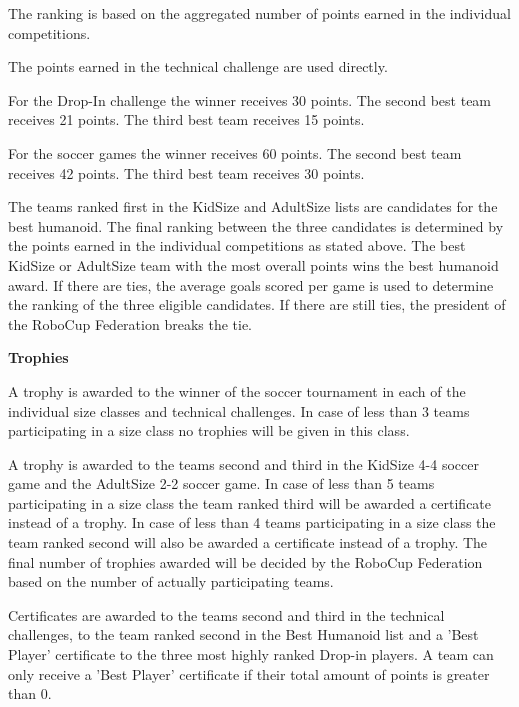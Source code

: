 The ranking is based on the aggregated number of points earned in the individual competitions.

\bigskip

The points earned in the technical challenge are used directly.

\bigskip

For the Drop-In challenge the winner receives 30 points. The second best team receives 21 points. The third best team receives 15 points.


\bigskip

For the soccer games the winner receives 60 points. The second best team receives 42 points. The third best team receives 30 points.

\bigskip

The teams ranked first in the KidSize and AdultSize lists
are candidates for the best humanoid.
The final ranking between the three candidates is determined by the points
earned in the individual competitions as stated above.
The best KidSize or AdultSize team with the most overall
points wins the best humanoid award.
If there are ties, the average goals scored per game is used to determine the
ranking of the three eligible candidates.
If there are still ties, the president of the RoboCup Federation breaks the tie.

\bigskip

{\bfseries Trophies}

\headlinebox

A trophy is awarded to the winner of the soccer tournament in each of the individual size classes and technical challenges. In case of less than 3 teams participating in a size class no trophies will be given in this class.

\bigskip

A trophy is awarded to the teams second and third in the KidSize 4-4 soccer game
 and the AdultSize 2-2 soccer game.
In case of less than 5 teams participating in a size class the team ranked third
will be awarded a certificate instead of a trophy.
In case of less than 4 teams participating in a size class the team ranked
second will also be awarded a certificate instead of a trophy.
The final number of trophies awarded will be decided by the RoboCup Federation
based on the number of actually participating teams.

\bigskip

Certificates are awarded to the teams second and third in the technical challenges,
to the team ranked second  in the Best Humanoid list
and a 'Best Player' certificate to the three most highly ranked Drop-in players.
A team can only receive a 'Best Player' certificate if their total amount of
points is greater than 0.

